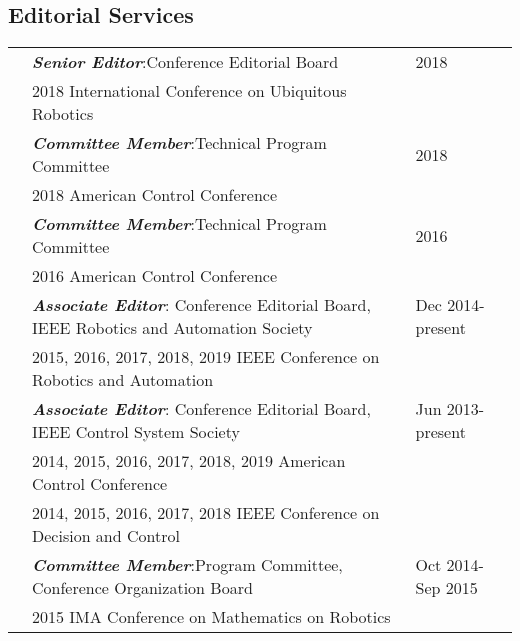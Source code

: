 \documentclass[10pt]{article}
\begin{document}
\vspace*{0.2cm}

\newcommand{\bfi}[1]{\textbf{\textit{#1}}}

\subsection*{Editorial Services}
\begin{tabularx}{\textwidth}{>{\setlength{\hsize}{0.5cm}}X%
>{\setlength{\hsize}{14.3cm}}X%
>{\hfill}X}

& \bfi{Senior Editor}:\quad Conference Editorial Board \quad  & 2018\\
& 2018 International Conference on Ubiquitous Robotics & \\[0.2cm]

& \bfi{Committee Member}:\quad Technical Program Committee \quad  & 2018\\
& 2018 American Control Conference & \\[0.2cm]

& \bfi{Committee Member}:\quad Technical Program Committee \quad  & 2016\\
& 2016 American Control Conference & \\[0.2cm]

&\bfi{Associate Editor}: Conference Editorial Board, IEEE Robotics and Automation Society & Dec 2014-present \\
& 2015, 2016, 2017, 2018, 2019 IEEE Conference on Robotics and Automation& \\[0.2cm]

&\bfi{Associate Editor}: Conference Editorial Board, IEEE Control System Society & Jun 2013-present \\
& 2014, 2015, 2016, 2017, 2018, 2019 American Control Conference& \\
& 2014, 2015, 2016, 2017, 2018 IEEE Conference on Decision and Control& \\[0.2cm]

& \bfi{Committee Member}:\quad Program Committee, Conference Organization Board\quad  & Oct 2014-Sep 2015\\
& 2015 IMA Conference on Mathematics on Robotics & \\[0.2cm]

\end{tabularx}

\vspace*{0.2cm}
\end{document}
